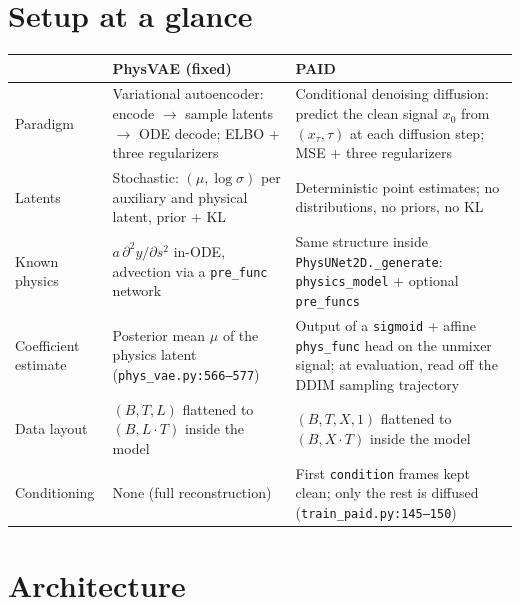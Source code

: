 \documentclass[11pt,a4paper]{article}
\newcommand{\code}[1]{\texttt{#1}}
\begin{document}
\section{Setup at a glance}

\begin{table}[h]
\centering
\small
\begin{tabularx}{\textwidth}{LXX}
\toprule
 & \textbf{PhysVAE (fixed)} & \textbf{PAID} \\
\midrule
Paradigm & Variational autoencoder: encode $\to$ sample latents $\to$ ODE decode; ELBO + three regularizers & Conditional denoising diffusion: predict the clean signal $x_0$ from $(x_\tau, \tau)$ at each diffusion step; MSE + three regularizers \\
Latents & Stochastic: $(\mu, \log\sigma)$ per auxiliary and physical latent, prior + KL & Deterministic point estimates; no distributions, no priors, no KL \\
Known physics & $a\,\partial^2 y/\partial s^2$ in-ODE, advection via a \code{pre\_func} network & Same structure inside \code{PhysUNet2D.\_generate}: \code{physics\_model} + optional \code{pre\_funcs} \\
Coefficient estimate & Posterior mean $\mu$ of the physics latent (\code{phys\_vae.py:566--577}) & Output of a \code{sigmoid} + affine \code{phys\_func} head on the unmixer signal; at evaluation, read off the DDIM sampling trajectory \\
Data layout & $(B, T, L)$ flattened to $(B, L\cdot T)$ inside the model & $(B, T, X, 1)$ flattened to $(B, X\cdot T)$ inside the model \\
Conditioning & None (full reconstruction) & First \code{condition} frames kept clean; only the rest is diffused (\code{train\_paid.py:145--150}) \\
\bottomrule
\end{tabularx}
\end{table}

\section{Architecture}
\end{document}
